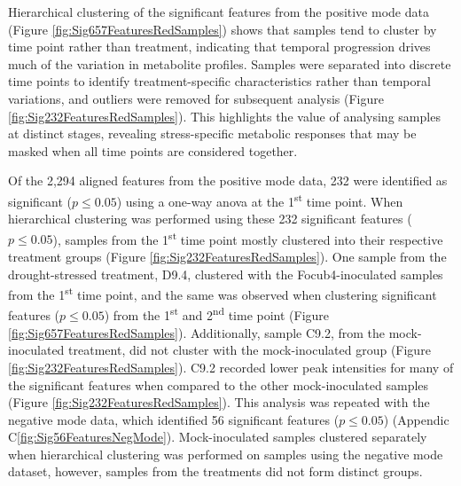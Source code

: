 
Hierarchical clustering of the significant features from the positive mode data (Figure \ref{fig:Sig657FeaturesRedSamples}) shows that samples tend to cluster by time point rather than treatment, indicating that temporal progression drives much of the variation in metabolite profiles. Samples were separated into discrete time points to identify treatment-specific characteristics rather than temporal variations, and outliers were removed for subsequent analysis (Figure \ref{fig:Sig232FeaturesRedSamples}). This highlights the value of analysing samples at distinct stages, revealing stress-specific metabolic responses that may be masked when all time points are considered together.

Of the 2,294 aligned features from the positive mode data, 232 were identified as significant ($p \le0.05$) using a one-way \ac{anova} at the 1\textsuperscript{st} time point. When hierarchical clustering was performed using these 232 significant features ($p \le0.05$), samples from the 1\textsuperscript{st} time point mostly clustered into their respective treatment groups (Figure \ref{fig:Sig232FeaturesRedSamples}). One sample from the drought-stressed treatment, D9.4, clustered with the \ac{Focub4}-inoculated samples from the 1\textsuperscript{st} time point, and the same was observed when clustering significant features ($p \le0.05$) from the 1\textsuperscript{st} and 2\textsuperscript{nd} time point (Figure \ref{fig:Sig657FeaturesRedSamples}). Additionally, sample C9.2, from the mock-inoculated treatment, did not cluster with the mock-inoculated group (Figure \ref{fig:Sig232FeaturesRedSamples}). C9.2 recorded lower peak intensities for many of the significant features when compared to the other mock-inoculated samples (Figure \ref{fig:Sig232FeaturesRedSamples}). This analysis was repeated with the negative mode data, which identified 56 significant features ($p \le0.05$) (Appendic C\ref{fig:Sig56FeaturesNegMode}). Mock-inoculated samples clustered separately when hierarchical clustering was performed on samples using the negative mode dataset, however, samples from the treatments did not form distinct groups.

